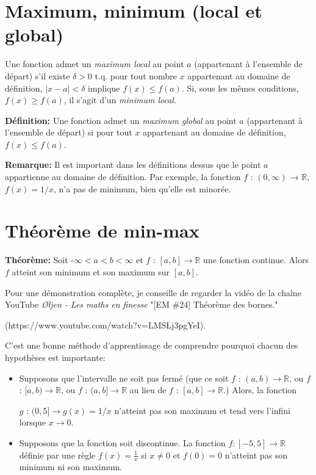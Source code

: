 \section{Maximum, minimum (local et global)}
\begin{boxdef}
     Une fonction admet un \textit{maximum local} au point $a$ (appartenant à l'ensemble de départ) s'il existe $\delta > 0$ t.q. pour tout nombre $x$ appartenant au domaine de définition, $|x - a| < \delta$ implique $f(x) \leq f(a)$. Si, sous les mêmes conditions, $f(x) \geq f(a)$, il s'agit d'un \textit{minimum local}.
\end{boxdef}

\begin{boxdef}
\textbf{Définition:} Une fonction admet un \textit{maximum global} au point $a$ (appartenant à l'ensemble de départ) si pour tout $x$ appartenant au domaine de définition, $f(x) \leq f(a)$.
\end{boxdef}

\textbf{Remarque:} Il est important dans les définitions dessus que le point $a$ appartienne au domaine de définition. Par exemple, la fonction $f$ : $(0, \infty)$ → $\mathbb{R}$, $f(x) = 1/x$, n'a pas de minimum, bien qu'elle est minorée.

\section{Théorème de min-max} \textbf{Théorème:} Soit -$ \infty < a < b < \infty$ et $f$ : $[a, b] \to \mathbb{R}$ une fonction continue.
Alors $f$ atteint son minimum et son maximum sur $[a, b]$. 

Pour une démonstration complète, je conseille de regarder la vidéo de la chaîne YouTube \textit{Øljen - Les maths en finesse} "[EM \#24] Théorème des bornes." 


(https://www.youtube.com/watch?v=LMSLj3pgYeI).

C'est une bonne méthode d'apprentissage de comprendre pourquoi chacun des hypothèses est importante:
\begin{itemize}
    \item Supposons que l'intervalle ne soit pas fermé (que ce soit $f$ : $(a, b) \to \mathbb{R}$, ou $f$ : $[a, b) \to \mathbb{R}$, ou $f$ : $(a, b] \to \mathbb{R}$ au lieu de $f$ : $[a, b] \to \mathbb{R}$.) Alors, la fonction 

    $g$ : $(0, 5] \to g(x)=1/x$ n'atteint pas son maximum et tend vers l'infini lorsque $x \to 0.$

    \item Supposons que la fonction soit discontinue. La fonction $f : [-5, 5] \to \mathbb{R}$ définie par une règle $f(x) = \frac{1}{x}$ si $x \neq 0$ et $f(0) = 0$ n'atteint pas son minimum ni son maximum.
\end{itemize}
